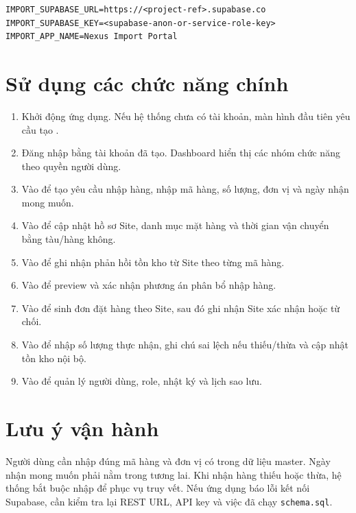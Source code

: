 \begin{lstlisting}
IMPORT_SUPABASE_URL=https://<project-ref>.supabase.co
IMPORT_SUPABASE_KEY=<supabase-anon-or-service-role-key>
IMPORT_APP_NAME=Nexus Import Portal
\end{lstlisting}

\section{Sử dụng các chức năng chính}

\begin{enumerate}
  \item Khởi động ứng dụng. Nếu hệ thống chưa có tài khoản, màn hình đầu tiên yêu cầu tạo .
  \item Đăng nhập bằng tài khoản đã tạo. Dashboard hiển thị các nhóm chức năng theo quyền người dùng.
  \item Vào  để tạo yêu cầu nhập hàng, nhập mã hàng, số lượng, đơn vị và ngày nhận mong muốn.
  \item Vào  để cập nhật hồ sơ Site, danh mục mặt hàng và thời gian vận chuyển bằng tàu/hàng không.
  \item Vào  để ghi nhận phản hồi tồn kho từ Site theo từng mã hàng.
  \item Vào  để preview và xác nhận phương án phân bổ nhập hàng.
  \item Vào  để sinh đơn đặt hàng theo Site, sau đó ghi nhận Site xác nhận hoặc từ chối.
  \item Vào  để nhập số lượng thực nhận, ghi chú sai lệch nếu thiếu/thừa và cập nhật tồn kho nội bộ.
  \item Vào  để quản lý người dùng, role, nhật ký và lịch sao lưu.
\end{enumerate}

\section{Lưu ý vận hành}

Người dùng cần nhập đúng mã hàng và đơn vị có trong dữ liệu master. Ngày nhận mong muốn phải nằm trong tương lai. Khi nhận hàng thiếu hoặc thừa, hệ thống bắt buộc nhập  để phục vụ truy vết. Nếu ứng dụng báo lỗi kết nối Supabase, cần kiểm tra lại REST URL, API key và việc đã chạy \texttt{schema.sql}.
